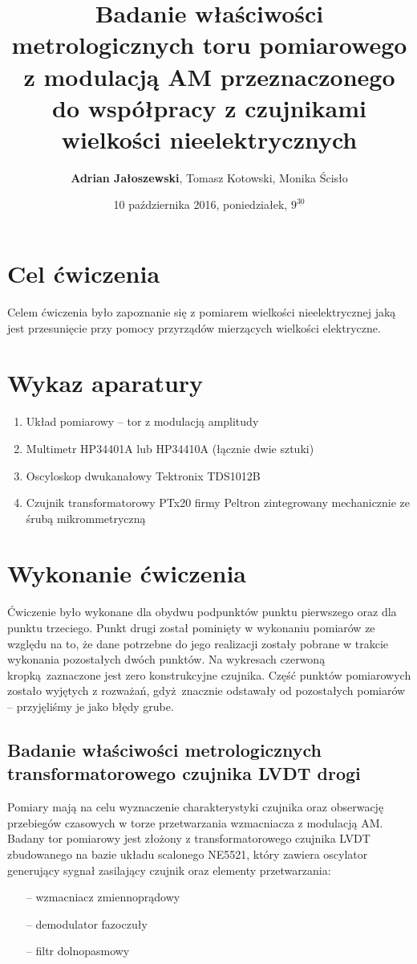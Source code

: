 \documentclass[a4paper, 12pt, titlepage]{article}
\title{Badanie właściwości metrologicznych toru pomiarowego z modulacją AM przeznaczonego do współpracy z czujnikami wielkości nieelektrycznych}
\author{\textbf{Adrian Jałoszewski}, Tomasz Kotowski, Monika Ścisło}
\date{10 października 2016, poniedziałek, $9^{\underline{30}}$}
\begin{document}
	\maketitle
	\tableofcontents
	\newpage
	\section{Cel ćwiczenia}
	Celem ćwiczenia było zapoznanie się z pomiarem wielkości nieelektrycznej jaką jest przesunięcie przy pomocy przyrządów mierzących wielkości elektryczne.
	\section{Wykaz aparatury}
	\begin{enumerate}
		\item Układ pomiarowy -- tor z modulacją amplitudy
		\item Multimetr HP34401A lub HP34410A (łącznie dwie sztuki)
		\item Oscyloskop dwukanałowy Tektronix TDS1012B
		\item Czujnik transformatorowy PTx20 firmy Peltron zintegrowany mechanicznie ze śrubą mikrommetryczną
	\end{enumerate}
	\section{Wykonanie ćwiczenia}
		Ćwiczenie było wykonane dla obydwu podpunktów punktu pierwszego oraz dla punktu trzeciego. Punkt drugi został pominięty w wykonaniu pomiarów ze względu na to, że dane potrzebne do jego realizacji zostały pobrane w trakcie wykonania pozostałych dwóch punktów. Na wykresach czerwoną kropką zaznaczone jest zero konstrukcyjne czujnika.
		\newline \newline
		Część punktów pomiarowych zostało wyjętych z rozważań, gdyż znacznie odstawały od pozostałych pomiarów -- przyjęliśmy je jako błędy grube.
		\subsection{Badanie właściwości metrologicznych transformatorowego czujnika LVDT drogi}
			Pomiary mają na celu wyznaczenie charakterystyki czujnika oraz obserwację przebiegów czasowych w torze przetwarzania wzmacniacza z modulacją AM. Badany tor pomiarowy jest złożony z transformatorowego czujnika LVDT zbudowanego na bazie układu scalonego NE5521, który zawiera oscylator generujący sygnał zasilający czujnik oraz elementy przetwarzania: 
			\begin{itemize}
				\item[--] wzmacniacz zmiennoprądowy
				\item[--] demodulator fazoczuły
				\item[--] filtr dolnopasmowy
			\end{itemize}
\end{document}
